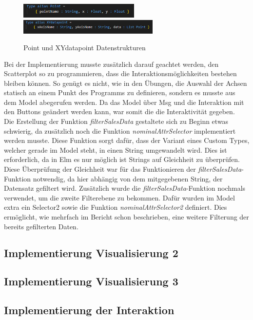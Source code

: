 \documentclass[usegeometry=true]{scrartcl}
\begin{document}
\begin{figure} [H]
	\begin{center}
		\includegraphics[width=6cm]{IMG/PointDatenstruktur}
		\includegraphics[width=7cm]{IMG/XYdatapoint}
		\caption{Point und XYdatapoint Datenstrukturen}
		\label{fig:Point_XYdatapoint}
	\end{center}
\end{figure}
\noindent Bei der Implementierung musste zusätzlich darauf geachtet werden, den Scatterplot so zu programmieren, dass die Interaktionsmöglichkeiten bestehen bleiben können.
So genügt es nicht, wie in den Übungen, die Auswahl der Achsen statisch an einem Punkt des Programms zu definieren, sondern es musste aus dem Model abegerufen werden. Da das
Model über Msg und die Interaktion mit den Buttons geändert werden kann, war somit die die Interaktivität gegeben. \\
Die Erstellung der Funktion \textit{filterSalesData} gestaltete sich zu Beginn etwas schwierig, da zusätzlich noch die Funktion \textit{nominalAttrSelector} implementiert werden
musste. Diese Funktion sorgt dafür, dass der Variant eines Custom Types, welcher gerade im Model steht, in einen String umgewandelt wird. Dies ist erforderlich, da in Elm es nur
möglich ist Strings auf Gleichheit zu überprüfen. Diese Überprüfung der Gleichheit war für das Funktionieren der \textit{filterSalesData}-Funktion notwendig, da hier abhängig
von dem mitgegebenen String, der Datensatz gefiltert wird. Zusätzlich wurde die \textit{filterSalesData}-Funktion nochmals verwendet, um die zweite Filterebene zu bekommen.
Dafür wurden im Model extra ein Selector2 sowie die Funktion \textit{nominalAttrSelector2} definiert. Dies ermöglicht, wie mehrfach im Bericht schon beschrieben, eine weitere 
Filterung der bereits gefilterten Daten.

\subsection{Implementierung Visualisierung 2}
\subsection{Implementierung Visualisierung 3}
\subsection{Implementierung der Interaktion}

\printbibliography
\end{document}
